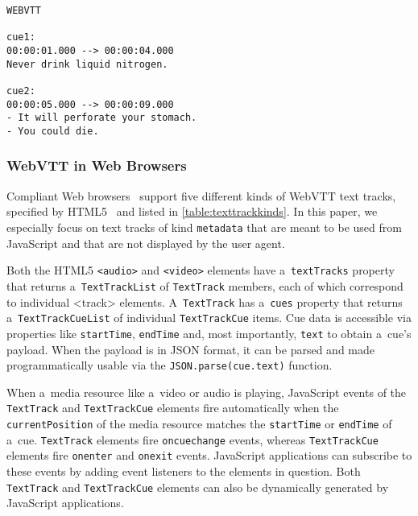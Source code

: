 \documentclass{sig-alternate}
\begin{document}
\begin{lstlisting}[caption={Exemplary WebVTT file%
~\cite{pfeiffer2013webvtt} with two cues
with the IDs \texttt{cue1} and \texttt{cue2} respectively},
  label=listing:webvtt, float=h!]
WEBVTT

cue1:
00:00:01.000 --> 00:00:04.000
Never drink liquid nitrogen.

cue2:
00:00:05.000 --> 00:00:09.000
- It will perforate your stomach.
- You could die.
\end{lstlisting}

\subsubsection{WebVTT in Web Browsers}

Compliant Web browsers~\cite{dutton2012trackelement}
support five different kinds of
WebVTT text tracks, specified by HTML5~\cite{berjon2013html5}
and listed in \autoref{table:texttrackkinds}.
In this paper, we especially focus on
text tracks of kind \texttt{metadata}
that are meant to be used from JavaScript and
that are not displayed by the user agent.

Both the HTML5 \texttt{<audio>} and \texttt{<video>} elements
have a~\texttt{textTracks} property
that returns a~\texttt{TextTrackList} of
\texttt{TextTrack} members, each of which correspond
to individual <track> elements.
A~\texttt{TextTrack} has a~\texttt{cues} property
that returns a~\texttt{TextTrackCueList} of individual
\texttt{TextTrackCue} items.
Cue data is accessible via properties like
\texttt{startTime}, \texttt{endTime} and,
most importantly, \texttt{text} to obtain a~cue's payload.
When the payload is in JSON format,
it can be parsed and made programmatically usable via the
\texttt{JSON.parse(cue.text)} function.

When a~media resource like a~video or audio is playing,
JavaScript events of the \texttt{TextTrack} and \texttt{TextTrackCue}
elements fire automatically when the \texttt{currentPosition}
of the media resource matches the
\texttt{startTime} or \texttt{endTime} of a~cue.
\texttt{TextTrack} elements fire \texttt{oncuechange} events,
whereas \texttt{TextTrackCue} elements fire
\texttt{onenter} and \texttt{onexit} events.
JavaScript applications can subscribe to these events
by adding event listeners to the elements in question.
Both \texttt{TextTrack} and \texttt{TextTrackCue} elements
can also be dynamically generated by JavaScript applications.
\end{document}
